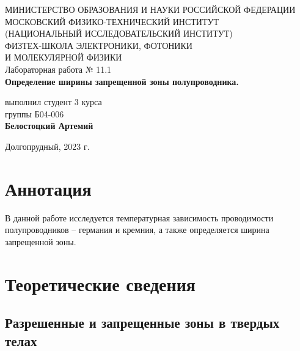 \documentclass[a4paper,12pt]{article}
\begin{document}
 

\begin{titlepage}
	\begin{center}
		\large 	МИНИСТЕРСТВО ОБРАЗОВАНИЯ И НАУКИ РОССИЙСКОЙ ФЕДЕРАЦИИ\\
				МОСКОВСКИЙ ФИЗИКО-ТЕХНИЧЕСКИЙ ИНСТИТУТ \\
				(НАЦИОНАЛЬНЫЙ ИССЛЕДОВАТЕЛЬСКИЙ ИНСТИТУТ)\\ 
				ФИЗТЕХ-ШКОЛА ЭЛЕКТРОНИКИ, ФОТОНИКИ \\
				И МОЛЕКУЛЯРНОЙ ФИЗИКИ \\
		
		
		\vspace{4.0 cm}
		Лабораторная работа № 11.1 \\
		\LARGE \textbf{Определение ширины запрещенной зоны полупроводника.}
	\end{center}
	\vspace{3 cm} \large
	
	\begin{flushright}
		выполнил студент 3 курса \\
		{группы Б04-006}\\
		\textbf{Белостоцкий Артемий}\\
	\end{flushright}
	
	\vfill

	\begin{center}
	Долгопрудный, 2023 г.
	\end{center}
\end{titlepage}                                                                      

\section*{Аннотация}

В данной работе исследуется температурная зависимость проводимости полупроводников -- германия и кремния, а также определяется ширина запрещенной зоны.

\section*{Теоретические сведения}

\subsection*{Разрешенные и запрещенные зоны в твердых телах}
\end{document}
